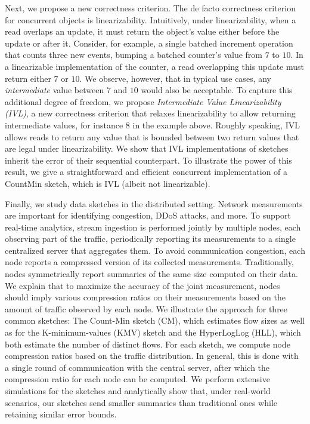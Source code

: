 {Next, we propose a new correctness criterion. The de facto correctness criterion for concurrent objects is linearizability. Intuitively, under linearizability, when a read overlaps an update, it must return the object's value either before the update or after it. Consider, for example, a single batched increment operation that counts three new events, bumping a batched counter's value from $7$ to $10$. In a linearizable implementation of the counter, a read overlapping this update must return either $7$ or $10$. We observe, however, that in typical use cases, any \emph{intermediate} value between $7$ and $10$ would also be acceptable. To capture this additional degree of freedom, we propose \emph{Intermediate Value Linearizability (IVL)}, a new correctness criterion that relaxes linearizability to allow returning intermediate values, for instance $8$ in the example above. Roughly speaking, IVL allows reads to return any value that is bounded between two return values that are legal under linearizability. We show that IVL implementations of sketches inherit the error of their sequential counterpart. To illustrate the power of this result, we give a straightforward and efficient concurrent implementation of a CountMin sketch, which is IVL (albeit not linearizable).

Finally, we study data sketches in the distributed setting. Network measurements are important for identifying congestion, DDoS attacks, and more. To support real-time analytics, stream ingestion is performed jointly by multiple nodes, each observing part of the traffic, periodically reporting its measurements to a single centralized server that aggregates them. To avoid communication congestion, each node reports a compressed version of its collected measurements. Traditionally, nodes symmetrically report summaries of the same size computed on their data. We explain that to maximize the accuracy of the joint measurement, nodes should imply various compression ratios on their measurements based on the amount of traffic observed by each node. We illustrate the approach for three common sketches: The Count-Min sketch (CM), which estimates flow sizes as well as for the K-minimum-values (KMV) sketch and the HyperLogLog (HLL), which both estimate the number of distinct flows. For each sketch, we compute node compression ratios based on the traffic distribution. In general, this is done with a single round of communication with the central server, after which the compression ratio for each node can be computed.
We perform extensive simulations for the sketches and analytically show that, under real-world scenarios, our sketches send smaller summaries than traditional ones while retaining similar error bounds.

} %


